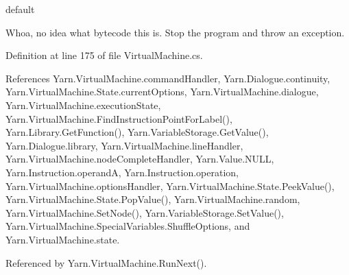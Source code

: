 \begin{DoxyItemize}
\item default

Whoa, no idea what bytecode this is. Stop the program and throw an exception.
\end{DoxyItemize}

Definition at line 175 of file Virtual\-Machine.\-cs.



References Yarn.\-Virtual\-Machine.\-command\-Handler, Yarn.\-Dialogue.\-continuity, Yarn.\-Virtual\-Machine.\-State.\-current\-Options, Yarn.\-Virtual\-Machine.\-dialogue, Yarn.\-Virtual\-Machine.\-execution\-State, Yarn.\-Virtual\-Machine.\-Find\-Instruction\-Point\-For\-Label(), Yarn.\-Library.\-Get\-Function(), Yarn.\-Variable\-Storage.\-Get\-Value(), Yarn.\-Dialogue.\-library, Yarn.\-Virtual\-Machine.\-line\-Handler, Yarn.\-Virtual\-Machine.\-node\-Complete\-Handler, Yarn.\-Value.\-N\-U\-L\-L, Yarn.\-Instruction.\-operand\-A, Yarn.\-Instruction.\-operation, Yarn.\-Virtual\-Machine.\-options\-Handler, Yarn.\-Virtual\-Machine.\-State.\-Peek\-Value(), Yarn.\-Virtual\-Machine.\-State.\-Pop\-Value(), Yarn.\-Virtual\-Machine.\-random, Yarn.\-Virtual\-Machine.\-Set\-Node(), Yarn.\-Variable\-Storage.\-Set\-Value(), Yarn.\-Virtual\-Machine.\-Special\-Variables.\-Shuffle\-Options, and Yarn.\-Virtual\-Machine.\-state.



Referenced by Yarn.\-Virtual\-Machine.\-Run\-Next().



